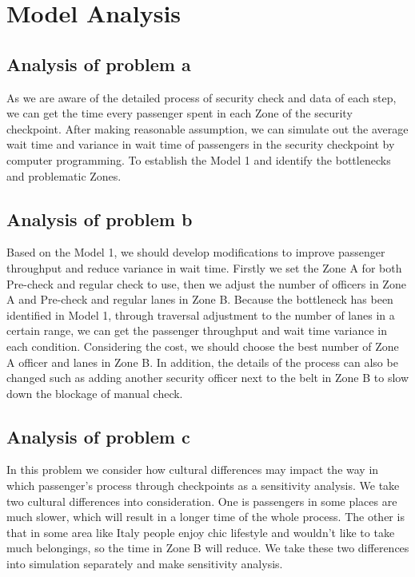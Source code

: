 \section{Model Analysis}
\subsection{Analysis of problem a}
As we are aware of the detailed process of security check and data of each step, we can get the time every passenger spent in each Zone of the security checkpoint. After making reasonable assumption, we can simulate out the average wait time and variance in wait time of passengers in the security checkpoint by computer programming. To establish the Model 1 and identify the bottlenecks and problematic Zones.
\subsection{Analysis of problem b}
Based on the Model 1, we should develop modifications to improve passenger throughput and reduce variance in wait time. Firstly we set the Zone A for both Pre-check and regular check to use, then we adjust the number of officers in Zone A and Pre-check and regular lanes in Zone B. Because the bottleneck has been identified in Model 1, through traversal adjustment to the number of lanes in a certain range, we can get the passenger throughput and wait time variance in each condition. Considering the cost, we should choose the best number of Zone A officer and lanes in Zone B. In addition, the details of the process can also be changed such as adding another security officer next to the belt in Zone B to slow down the blockage of manual check.

\subsection{Analysis of problem c}
In this problem we consider how cultural differences may impact the way in which passenger's process through checkpoints as a sensitivity analysis. We take two cultural differences into consideration. One is passengers in some places are much slower, which will result in a longer time of the whole process. The other is that in some area like Italy people enjoy chic lifestyle and wouldn't like to take much belongings, so the time in Zone B will reduce. We take these two differences into simulation separately and make sensitivity analysis.
